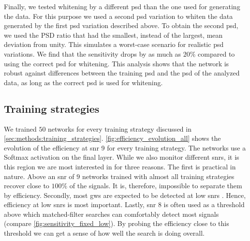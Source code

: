 Finally, we tested whitening by a different \acrshort{psd} than the one used for generating the data. For this purpose we used a second \acrshort{psd} variation to whiten the data generated by the first \acrshort{psd} variation described above. To obtain the second \acrshort{psd}, we used the PSD ratio that had the smallest, instead of the largest, mean deviation from unity. This simulates a worst-case scenario for realistic \acrshort{psd} variations. We find that the sensitivity drops by as much as $20\%$ compared to using the correct \acrshort{psd} for whitening. This analysis shows that the network is robust against differences between the training \acrshort{psd} and the \acrshort{psd} of the analyzed data, as long as the correct \acrshort{psd} is used for whitening.

\subsection{Training strategies}
We trained $50$ networks for every training strategy discussed in \autoref{sec:methods:training_strategies}. \autoref{fig:efficiency_evolution_all} shows the evolution of the efficiency at \acrshort{snr} 9 for every training strategy. The networks use a Softmax activation on the final layer. While we also monitor different \acrshort{snr}s, it is this region we are most interested in for three reasons. The first is practical in nature. Above an \acrshort{snr} of $9$ networks trained with almost all training strategies recover close to $100\%$ of the signals. It is, therefore, impossible to separate them by efficiency. Secondly, most \acrshort{gw}s are expected to be detected at low \acrshort{snr}s \cite{Schutz:2011tw}. Hence, efficiency at low \acrshort{snr}s is most important. Lastly, \acrshort{snr} 8 is often used as a threshold above which matched-filter searches can comfortably detect most signals (compare \autoref{fig:sensitivity_fixed_low}). By probing the efficiency close to this threshold we can get a sense of how well the search is doing overall.

